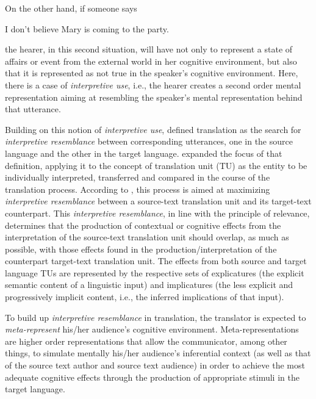 \documentclass[output=paper]{langsci/langscibook}
\begin{document}
On the other hand, if someone says 

\ea
I don't believe Mary is coming to the party. \\
\z

the hearer, in this second situation, will have not only to represent a state of affairs or event from the external world in her cognitive environment, but also that it is represented as not true in the speaker's cognitive environment. Here, there is a case of \textit{interpretive use}, i.e., the hearer creates a second order mental representation aiming at resembling the speaker's mental representation behind that utterance. 


Building on this notion of \textit{interpretive use}, \citet{Gutt1991} defined translation as the search for \textit{interpretive resemblance }between corresponding utterances, one in the source language and the other in the target language. \citet{Goncalves2003} expanded the focus of that definition, applying it to the concept of translation unit (TU) as the entity to be individually interpreted, transferred and compared in the course of the translation process. According to \citet{Goncalves2003}, this process is aimed at maximizing \textit{interpretive resemblance }between a source-text translation unit and its target-text counterpart. This \textit{interpretive resemblance}, in line with the principle of relevance, determines that the production of contextual or cognitive effects from the interpretation of the source-text translation unit should overlap, as much as possible, with those effects found in the production/interpretation of the counterpart target-text translation unit. The effects from both source and target language TUs are represented by the respective sets of explicatures (the explicit semantic content of a linguistic input) and implicatures (the less explicit and progressively implicit content, i.e., the inferred implications of that input).



To build up \textit{interpretive resemblance} in translation, the translator is expected to \textit{meta-represent} his/her audience's cognitive environment. Meta-representations are higher order representations that allow the communicator, among other things, to simulate mentally his/her audience's inferential context (as well as that of the source text author and source text audience) in order to achieve the most adequate cognitive effects through the production of appropriate stimuli in the target language.  
\end{document}
